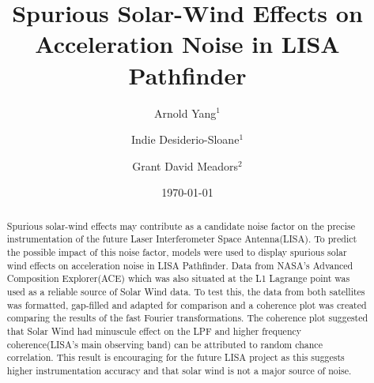 \documentclass[%
 reprint,
 amsmath,amssymb,
 aps,
]{revtex4-2}
\begin{document}

\title{Spurious Solar-Wind Effects on Acceleration Noise in LISA Pathfinder}%
\author{Arnold Yang\(^1\)}%
\author{Indie Desiderio-Sloane\(^1\)}
 \author{Grant David Meadors\(^2\)}

%

\date{\today}%

\begin{abstract}
Spurious solar-wind effects may contribute as a candidate noise factor on the precise instrumentation of the future Laser Interferometer Space Antenna(LISA). To predict the possible impact of this noise factor, models were used to display spurious solar wind effects on acceleration noise in LISA Pathfinder. Data from NASA's Advanced Composition Explorer(ACE) which was also situated at the L1 Lagrange point was used as a reliable source of Solar Wind data. To test this, the data from both satellites was formatted, gap-filled and adapted for comparison and a coherence plot was created comparing the results of the fast Fourier transformations. The coherence plot suggested that Solar Wind had minuscule effect on the LPF and higher frequency coherence(LISA’s main observing band) can be attributed to random chance correlation. This result is encouraging for the future LISA project as this suggests higher instrumentation accuracy and that solar wind is not a major source of noise.
\end{abstract}

\maketitle

\end{document}
